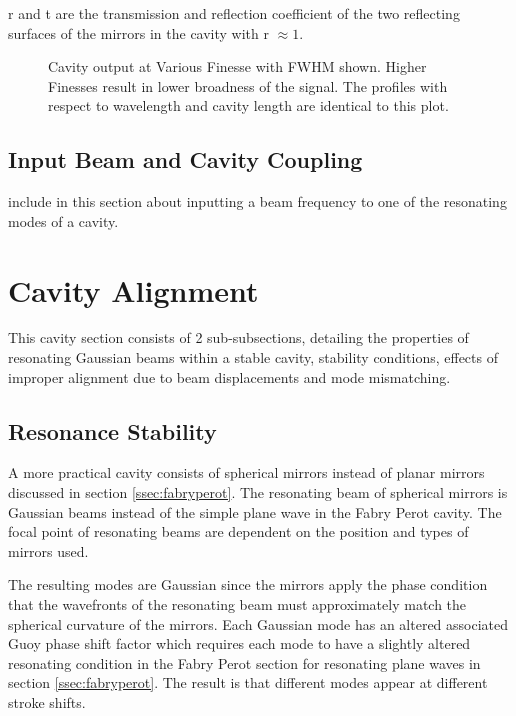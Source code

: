 \documentclass[a4paper]{book}
\newcommand{\imginput}[1]{} %
\begin{document}
		r and t are the transmission and reflection coefficient of the two reflecting surfaces of the mirrors in the cavity with r $\approx 1$.
		
		\begin{figure} [!ht]
			\centering
			\def\svgwidth{\columnwidth}
			\resizebox{160mm}{!}{\imginput{images/cav-res-profiles.pdf_tex}}
			\caption{\cite{steck}Cavity output at Various Finesse with FWHM shown. Higher Finesses result in lower broadness of the signal. The profiles with respect to wavelength and cavity length are identical to this plot. }
			\label{fig:cav-res-profiles}
		\end{figure}			

		\subsection{Input Beam and Cavity Coupling}
			include in this section about inputting a beam frequency to one of the resonating modes of a cavity.
	\section{Cavity Alignment}
		\label{sec:Cavity Alignment}
		This cavity section consists of 2 sub-subsections, detailing the properties of resonating Gaussian beams within a stable cavity, stability conditions, effects of improper alignment due to beam displacements and mode mismatching.
	
		\subsection {Resonance Stability}
			\label{ssec:ResonaceSability}
			A more practical cavity consists of spherical mirrors instead of planar mirrors discussed in section \ref{ssec:fabryperot}. 
			The resonating beam of spherical mirrors is Gaussian beams instead of the simple plane wave in the Fabry Perot cavity. The focal point of resonating beams are dependent on the position and types of mirrors used. 
			
			The resulting modes are Gaussian since the mirrors apply the phase condition that the wavefronts of the resonating beam must approximately match the spherical curvature of the mirrors.
			Each Gaussian mode has an altered associated Guoy phase shift factor which requires each mode to have a slightly altered resonating condition in the Fabry Perot section for resonating plane waves in section \ref{ssec:fabryperot}. The result is that different modes appear at different stroke shifts.
			
\end{document}
